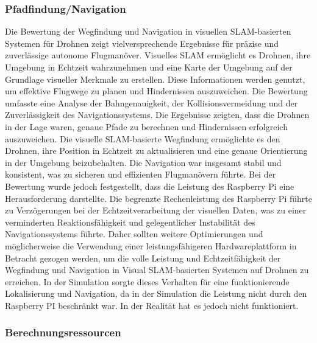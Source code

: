 \subsubsection{Pfadfindung/Navigation}

Die Bewertung der Wegfindung und Navigation in visuellen SLAM-basierten Systemen für Drohnen zeigt vielversprechende Ergebnisse für präzise und zuverlässige autonome Flugmanöver. Visuelles SLAM ermöglicht es Drohnen, ihre Umgebung in Echtzeit wahrzunehmen und eine Karte der Umgebung auf der Grundlage visueller Merkmale zu erstellen. Diese Informationen werden genutzt, um effektive Flugwege zu planen und Hindernissen auszuweichen. Die Bewertung umfasste eine Analyse der Bahngenauigkeit, der Kollisionsvermeidung und der Zuverlässigkeit des Navigationssystems. Die Ergebnisse zeigten, dass die Drohnen in der Lage waren, genaue Pfade zu berechnen und Hindernissen erfolgreich auszuweichen. Die visuelle SLAM-basierte Wegfindung ermöglichte es den Drohnen, ihre Position in Echtzeit zu aktualisieren und eine genaue Orientierung in der Umgebung beizubehalten. Die Navigation war insgesamt stabil und konsistent, was zu sicheren und effizienten Flugmanövern führte. Bei der Bewertung wurde jedoch festgestellt, dass die Leistung des Raspberry Pi eine Herausforderung darstellte. Die begrenzte Rechenleistung des Raspberry Pi führte zu Verzögerungen bei der Echtzeitverarbeitung der visuellen Daten, was zu einer verminderten Reaktionsfähigkeit und gelegentlicher Instabilität des Navigationssystems führte. Daher sollten weitere Optimierungen und möglicherweise die Verwendung einer leistungsfähigeren Hardwareplattform in Betracht gezogen werden, um die volle Leistung und Echtzeitfähigkeit der Wegfindung und Navigation in Visual SLAM-basierten Systemen auf Drohnen zu erreichen. In der Simulation sorgte dieses Verhalten für eine funktionierende Lokalisierung und Navigation, da in der Simulation die Leistung nicht durch den Raspberry PI beschränkt war. In der Realität hat es jedoch nicht funktioniert.

\subsubsection{Berechnungsressourcen}

